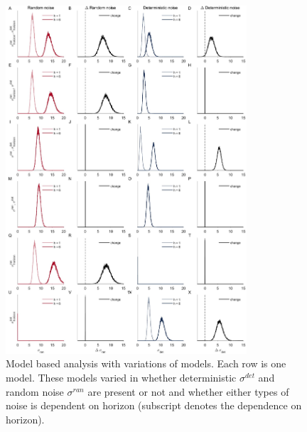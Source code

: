 \documentclass[12pt]{article}
\begin{document}
	\newpage
	\begin{figure}[t]
		\begin{center}
			\includegraphics[width=0.8\textwidth]{figures/RDBayes_2noise_hyperpriors_6model.jpg}
			\caption{Model based analysis with variations of models. Each row is one model.  These models varied in whether deterministic $\sigma^{det}$ and random noise $\sigma^{ran}$ are present or not and whether either types of noise is dependent on horizon (subscript denotes the dependence on horizon). }
			\label{fig:s9}
		\end{center}
	\end{figure}

\newpage
\end{document}

